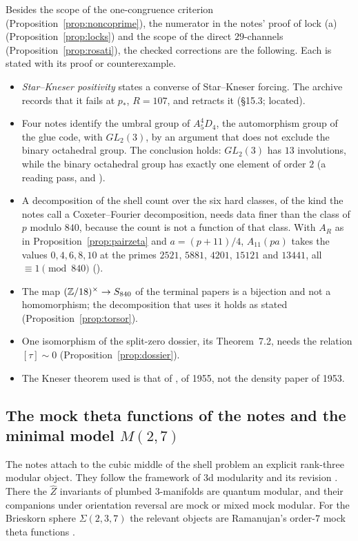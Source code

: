 Besides the scope of the one-congruence criterion (Proposition~\ref{prop:noncoprime}), the numerator in the notes' proof of lock (a) (Proposition~\ref{prop:locks}) and the scope of the direct $29$-channels (Proposition~\ref{prop:rosati}), the checked corrections are the following. Each is stated with its proof or counterexample.
\begin{itemize}
\item \emph{Star--Kneser positivity} states a converse of Star--Kneser forcing. The archive records that it fails at $p_*$, $R=107$, and retracts it (§15.3; located).
\item Four notes identify the umbral group of $A_5^4D_4$, the automorphism group of the glue code, with $GL_2(3)$, by an argument that does not exclude the binary octahedral group. The conclusion holds: $GL_2(3)$ has $13$ involutions, while the binary octahedral group has exactly one element of order $2$ (a reading pass, and ).
\item A decomposition of the shell count over the six hard classes, of the kind the notes call a Coxeter--Fourier decomposition, needs data finer than the class of $p$ modulo $840$, because the count is not a function of that class. With $A_R$ as in Proposition~\ref{prop:pairzeta} and $a=(p+11)/4$, $A_{11}(pa)$ takes the values $0,4,6,8,10$ at the primes $2521$, $5881$, $4201$, $15121$ and $13441$, all $\equiv1\pmod{840}$ ().
\item The map $(\mathbb{Z}/18)^\times\to S_{840}$ of the terminal papers is a bijection and not a homomorphism; the decomposition that uses it holds as stated (Proposition~\ref{prop:torsor}).
\item One isomorphism of the split-zero dossier, its Theorem~7.2, needs the relation $[\tau]\sim0$ (Proposition~\ref{prop:dossier}).
\item The Kneser theorem used is that of \cite{Kneser}, of 1955, not the density paper of 1953.
\end{itemize}

\subsection{The mock theta functions of the notes and the minimal model \texorpdfstring{$M(2,7)$}{M(2,7)}}\label{ssec:mock}

The notes attach to the cubic middle of the shell problem an explicit rank-three modular object. They follow the framework of 3d modularity \cite{CCFGH} and its revision \cite{CCKPS}. There the $\widehat Z$ invariants of plumbed $3$-manifolds are quantum modular, and their companions under orientation reversal are mock or mixed mock modular. For the Brieskorn sphere $\Sigma(2,3,7)$ the relevant objects are Ramanujan's order-$7$ mock theta functions \cite{CFS,CCKPS}.

